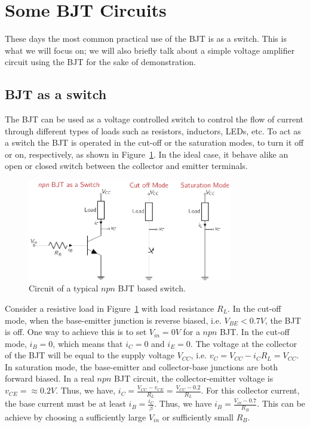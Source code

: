 \section{Some BJT Circuits}
These days the most common practical use of the BJT is as a switch. This is what we will focus on; we will also briefly talk about a simple voltage amplifier circuit using the BJT for the sake of demonstration.

\subsection{BJT as a switch}
The BJT can be used as a voltage controlled switch to control the flow of current through different types of loads such as resistors, inductors, LEDs, etc. To act as a switch the BJT is operated in the cut-off or the saturation modes, to turn it off or on, respectively, as shown in Figure~\ref{fig:03-bjt-switch-ckt}. In the ideal case, it behave alike an open or closed switch between the collector and emitter terminals. 
\begin{figure}[htbp]
    \centering
    \includegraphics[width=0.8\textwidth]{figures/ch03/fig03-bjt-switch.pdf}
    \caption{Circuit of a typical $npn$ BJT based switch.}
    \label{fig:03-bjt-switch-ckt}
\end{figure}

Consider a resistive load in Figure~\ref{fig:03-bjt-switch-ckt} with load resistance $R_L$. In the cut-off mode, when the base-emitter junction is reverse biased, i.e. $V_{BE} < 0.7V$, the BJT is off. One way to achieve this is to set $V_{in} = 0V$ for a $npn$ BJT. In the cut-off mode, $i_B = 0$, which means that $i_C = 0$ and $i_E = 0$. The voltage at the collector of the BJT will be equal to the supply voltage $V_{CC}$, i.e. $v_C = V_{CC} - i_C R_L = V_{CC}$. In saturation mode, the base-emitter and collector-base junctions are both forward biased. In a real $npn$ BJT circuit, the collector-emitter voltage is $v_{CE} = \approx 0.2V$. Thus, we have, $i_C = \frac{V_{CC} - v_{CE}}{R_L} = \frac{V_{CC} - 0.2}{R_L}$. For this collector current, the base current must be at least $i_B = \frac{i_C}{\beta}$. Thus, we have $i_B = \frac{V_{in} - 0.7}{R_B}$. This can be achieve by choosing a sufficiently large $V_{in}$ or sufficiently small $R_B$.

